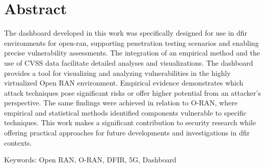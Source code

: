 \chapter*{Abstract}
\label{chap:abstract}
The dashboard developed in this work was specifically designed for use in \gls{dfir} environments for \gls{open-ran}, supporting penetration testing scenarios and enabling precise vulnerability assessments. The integration of an empirical method and the use of CVSS data facilitate detailed analyses and visualizations. The dashboard provides a tool for visualizing and analyzing vulnerabilities in the highly virtualized Open RAN environment. Empirical evidence demonstrates which attack techniques pose significant risks or offer higher potential from an attacker{’}s perspective. The same findings were achieved in relation to O-RAN, where empirical and statistical methods identified components vulnerable to specific techniques. This work makes a significant contribution to security research while offering practical approaches for future developments and investigations in \gls{dfir} contexts.
\par Keywords: Open RAN, O-RAN, DFIR, 5G, Dashboard